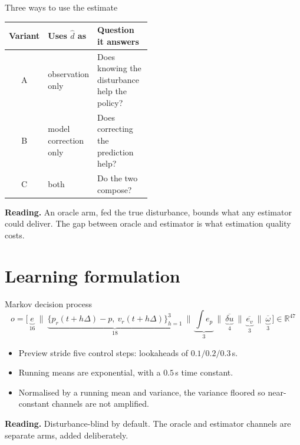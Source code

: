 \documentclass[10pt]{beamer}
\newcommand{\takeaway}[1]{\par\vfill{\footnotesize\textbf{Reading.} #1\par}}
\begin{document}
\begin{frame}{Three ways to use the estimate}
  \begin{table}
    \centering
    \small
    \begin{tabular}{clp{0.48\linewidth}}
      \toprule
      Variant & Uses $\hat d$ as & Question it answers \\
      \midrule
      A & observation only & Does knowing the disturbance help the policy? \\
      B & model correction only & Does correcting the prediction help? \\
      C & both & Do the two compose? \\
      \bottomrule
    \end{tabular}
  \end{table}
  \takeaway{An oracle arm, fed the true disturbance, bounds what any
    estimator could deliver. The gap between oracle and estimator is what
    estimation quality costs.}
\end{frame}

\section{Learning formulation}

\begin{frame}{Markov decision process}
  {\footnotesize
  \[
    o=\big[\,\underbrace{e}_{16}\ \|\
      \underbrace{\{p_r(t{+}h\Delta)-p,\ v_r(t{+}h\Delta)\}_{h=1}^{3}}_{18}\ \|\
      \underbrace{\textstyle\int e_p}_{3}\ \|\
      \underbrace{\overline{\delta u}}_{4}\ \|\
      \underbrace{\overline{e_v}}_{3}\ \|\
      \underbrace{\overline{\omega}}_{3}\,\big]\in\mathbb{R}^{47}
  \]}
  \begin{itemize}
    \item Preview stride five control steps: lookaheads of $0.1/0.2/0.3\,$s.
    \item Running means are exponential, with a $0.5\,$s time constant.
    \item Normalised by a running mean and variance, the variance floored so
      near-constant channels are not amplified.
  \end{itemize}
  \takeaway{Disturbance-blind by default. The oracle and estimator channels
    are separate arms, added deliberately.}
\end{frame}
\end{document}
